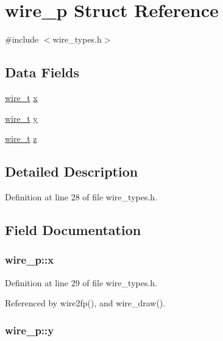 \hypertarget{structwire__p}{\section{wire\-\_\-p Struct Reference}
\label{structwire__p}
}


{\ttfamily \#include $<$wire\-\_\-types.\-h$>$}

\subsection*{Data Fields}
\begin{DoxyCompactItemize}
\item 
\hyperlink{wire__types_8h_ace84d5e6e326f6a52d978bd9900baee6}{wire\-\_\-t} \hyperlink{structwire__p_a7a555c323bd3699ff2db08a3b3e791ed}{x}
\item 
\hyperlink{wire__types_8h_ace84d5e6e326f6a52d978bd9900baee6}{wire\-\_\-t} \hyperlink{structwire__p_a32b151309922af59db0cafea09e77b67}{y}
\item 
\hyperlink{wire__types_8h_ace84d5e6e326f6a52d978bd9900baee6}{wire\-\_\-t} \hyperlink{structwire__p_a423cfb83825fc447478c866e4c2f6520}{z}
\end{DoxyCompactItemize}


\subsection{Detailed Description}


Definition at line 28 of file wire\-\_\-types.\-h.



\subsection{Field Documentation}
\hypertarget{structwire__p_a7a555c323bd3699ff2db08a3b3e791ed}{
\subsubsection[{x}]{ wire\-\_\-p\-::x}}\label{structwire__p_a7a555c323bd3699ff2db08a3b3e791ed}


Definition at line 29 of file wire\-\_\-types.\-h.



Referenced by wire2fp(), and wire\-\_\-draw().

\hypertarget{structwire__p_a32b151309922af59db0cafea09e77b67}{
\subsubsection[{y}]{ wire\-\_\-p\-::y}}\label{structwire__p_a32b151309922af59db0cafea09e77b67}


